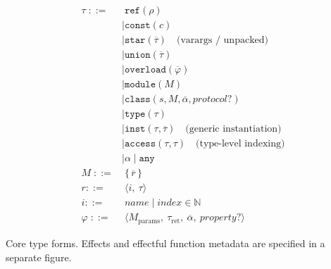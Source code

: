 
\begin{align*}
\tau \;::=&\; \texttt{ref}(\rho)
  \\ &  \mid \texttt{const}(c)
  \\ &  \mid \texttt{star}(\overline{\tau}) \quad \text{(varargs / unpacked)}
\\ & \mid \texttt{union}(\overline{\tau})
 \\ &  \mid \texttt{overload}(\overline{\varphi})
 \\ &  \mid \texttt{module}(M)
 \\ &  \mid \texttt{class}(s, M, \overline{\alpha}, \textit{protocol?})
\\ & \mid \texttt{type}(\tau)
  \\ &  \mid \texttt{inst}(\tau, \overline{\tau}) \quad \text{(generic instantiation)}
   \\ & \mid \texttt{access}(\tau,\tau) \quad \text{(type-level indexing)}
\\ & \mid \alpha \mid \texttt{any}
\\[0.5ex]
M \;::=&\; \{\, \overline{r} \,\}
\\
r ::= &\; \langle i,\ \tau \rangle
\\
i ::= &\; \textit{name} \mid \textit{index} \in \mathbb{N}
\\[0.5ex]
\varphi \;::=&\; \langle M_{\text{params}},\ \tau_{\text{ret}},\ \overline{\alpha},\ \textit{property?} \rangle
\end{align*}
\caption{Core type forms. Effects and effectful function metadata are specified in a separate figure.}
\label{fig:types-core}
